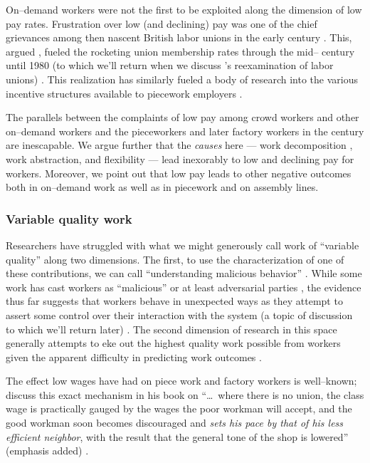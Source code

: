 \documentclass[trackingWork]{subfiles}
\begin{document}
{    On--demand workers were not the first to be exploited along the dimension of low pay rates.
    Frustration over low (and declining) pay was one of the chief grievances among then nascent
    British labor unions in the early  century
    \cite{turner1952trade}.
    This, \citeauthor{ebbinghaus1999institutions} argued%
,     fueled the rocketing union membership rates through the mid-- century until 1980
    (to which we'll return when we discuss \citeauthor{levi2009union}'s reexamination of labor unions)
    \cite{ebbinghaus1999institutions,levi2009union}.
    This realization has similarly fueled a body of research into
    the various incentive structures available to piecework employers
    \cite{roy1953work}.


    The parallels between the complaints of low pay among crowd workers and other on--demand workers
    and the pieceworkers and later factory workers in the  century
    are inescapable.
    We argue further that the \textit{causes} here
    --- work decomposition%
,     work abstraction, and
    flexibility ---
    lead inexorably to low and declining pay for workers.
    Moreover, we point out that low pay leads to other negative outcomes both
    in on--demand work
    as well as
    in piecework and on assembly lines.

    \subsubsection{Variable quality work}
    Researchers have struggled with what we might generously call work of ``variable quality''
    along two dimensions.
    The first, to use the characterization of one of these contributions, we can call
    ``understanding malicious behavior''
    \cite{MaliciouscrowdworkersGadiraju}.
    While some work has cast workers as ``malicious'' or at least adversarial parties%
,     the evidence thus far suggests that
    workers behave in unexpected ways as they attempt to assert some control over their interaction with the system
    (a topic of discussion to which we'll return later)
    \cite{uberAlgorithm}.
    The second dimension of research in this space generally attempts
    to eke out the highest quality work possible from workers
    given the apparent difficulty in predicting work outcomes
    \cite{embracingErrorKrishna}.



    The effect low wages have had on piece work and factory workers is well--known;
    \citeauthor{gantt1913work} discuss this exact mechanism in his book on
    ``\dots~where there is no union,
         the class wage is practically gauged by the wages the poor workman will accept,
         and the good workman soon becomes discouraged and \textit{sets his pace by that of his less efficient neighbor},
         with the result that the general tone of the shop is lowered'' (emphasis added)
    \cite{gantt1913work}.

}
\end{document}
